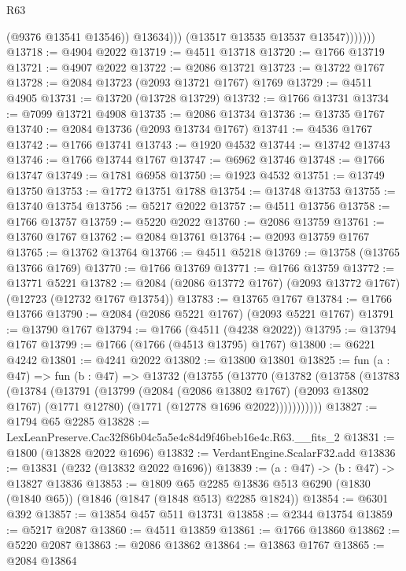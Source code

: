\begin{lexlean}{R63}
\begin{coremodule}
                        (@9376 @13541 @13546))
                      @13634)))
                (@13517 @13535 @13537 @13547)))))))
@13718 := @4904 @2022
@13719 := @4511 @13718
@13720 := @1766 @13719
@13721 := @4907 @2022
@13722 := @2086 @13721
@13723 := @13722 @1767
@13728 := @2084 @13723 (@2093 @13721 @1767) @1769
@13729 := @4511 @4905
@13731 := @13720 (@13728 @13729)
@13732 := @1766 @13731
@13734 := @7099 @13721 @4908
@13735 := @2086 @13734
@13736 := @13735 @1767
@13740 := @2084 @13736 (@2093 @13734 @1767)
@13741 := @4536 @1767
@13742 := @1766 @13741
@13743 := @1920 @4532
@13744 := @13742 @13743
@13746 := @1766 @13744 @1767
@13747 := @6962 @13746
@13748 := @1766 @13747
@13749 := @1781 @6958
@13750 := @1923 @4532
@13751 := @13749 @13750
@13753 := @1772 @13751 @1788
@13754 := @13748 @13753
@13755 := @13740 @13754
@13756 := @5217 @2022
@13757 := @4511 @13756
@13758 := @1766 @13757
@13759 := @5220 @2022
@13760 := @2086 @13759
@13761 := @13760 @1767
@13762 := @2084 @13761
@13764 := @2093 @13759 @1767
@13765 := @13762 @13764
@13766 := @4511 @5218
@13769 := @13758 (@13765 @13766 @1769)
@13770 := @1766 @13769
@13771 := @1766 @13759
@13772 := @13771 @5221
@13782 := @2084 (@2086 @13772 @1767) (@2093 @13772 @1767) (@12723 (@12732 @1767 @13754))
@13783 := @13765 @1767
@13784 := @1766 @13766
@13790 := @2084 (@2086 @5221 @1767) (@2093 @5221 @1767)
@13791 := @13790 @1767
@13794 := @1766 (@4511 (@4238 @2022))
@13795 := @13794 @1767
@13799 := @1766 (@1766 (@4513 @13795) @1767)
@13800 := @6221 @4242
@13801 := @4241 @2022
@13802 := @13800 @13801
@13825 := fun (a : @47) =>
  fun (b : @47) =>
  @13732
    (@13755
      (@13770
        (@13782
          (@13758
            (@13783
              (@13784
                (@13791
                  (@13799
                    (@2084
                      (@2086 @13802 @1767)
                      (@2093 @13802 @1767)
                      (@1771 @12780)
                      (@1771 (@12778 @1696 @2022)))))))))))
@13827 := @1794 @65 @2285
@13828 := LexLeanPreserve.Cac32f86b04c5a5e4c84d9f46beb16e4c.R63.__fits_2
@13831 := @1800 (@13828 @2022 @1696)
@13832 := VerdantEngine.ScalarF32.add
@13836 := @13831 (@232 (@13832 @2022 @1696))
@13839 := (a : @47) -> (b : @47) -> @13827 @13836
@13853 := @1809
    @65
    @2285
    @13836
    @513
    @6290
    (@1830 (@1840 @65))
    (@1846 (@1847 (@1848 @513) @2285 @1824))
@13854 := @6301 @392
@13857 := @13854 @457 @511 @13731
@13858 := @2344 @13754
@13859 := @5217 @2087
@13860 := @4511 @13859
@13861 := @1766 @13860
@13862 := @5220 @2087
@13863 := @2086 @13862
@13864 := @13863 @1767
@13865 := @2084 @13864

\end{coremodule}
\end{lexlean}
